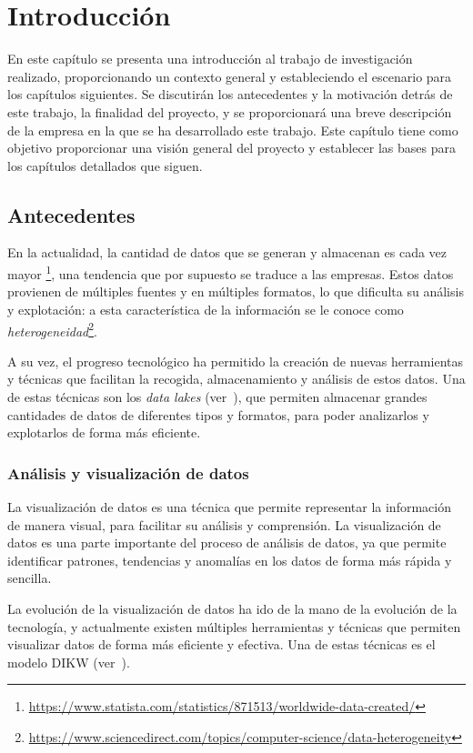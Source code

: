 \chapter{Introducción}\label{chap:intro}
En este capítulo se presenta una introducción al trabajo de investigación realizado, proporcionando
un contexto general y estableciendo el escenario para los capítulos siguientes. Se discutirán los
antecedentes y la motivación detrás de este trabajo, la finalidad del proyecto, y se proporcionará
una breve descripción de la empresa en la que se ha desarrollado este trabajo. Este capítulo tiene
como objetivo proporcionar una visión general del proyecto y establecer las bases para los capítulos
detallados que siguen.

\section{Antecedentes}\label{sec:antecedentes}
En la actualidad, la cantidad de datos que se generan y almacenan es cada vez mayor
\footnote{\url{https://www.statista.com/statistics/871513/worldwide-data-created/}}, una tendencia
que por supuesto se traduce a las empresas. Estos datos provienen de múltiples fuentes y en múltiples
formatos, lo que dificulta su análisis y explotación: a esta característica de la información se le
conoce como \textit{heterogeneidad}\footnote{\url{https://www.sciencedirect.com/topics/computer-science/data-heterogeneity}}.

A su vez, el progreso tecnológico ha permitido la creación de nuevas herramientas y técnicas
que facilitan la recogida, almacenamiento y análisis de estos datos. Una de estas técnicas son
los \textit{data lakes} (ver~),
que permiten almacenar grandes cantidades de datos de diferentes tipos y formatos, para poder
analizarlos y explotarlos de forma más eficiente.

\subsection{Análisis y visualización de datos}\label{subsec:datos}
La visualización de datos es una técnica que permite representar la información de manera visual,
para facilitar su análisis y comprensión. La visualización de datos es una parte importante del
proceso de análisis de datos, ya que permite identificar patrones, tendencias y anomalías en los
datos de forma más rápida y sencilla.

La evolución de la visualización de datos ha ido de la mano de la evolución de la tecnología, y
actualmente existen múltiples herramientas y técnicas que permiten visualizar datos de forma
más eficiente y efectiva. Una de estas técnicas es el modelo DIKW (ver~).

